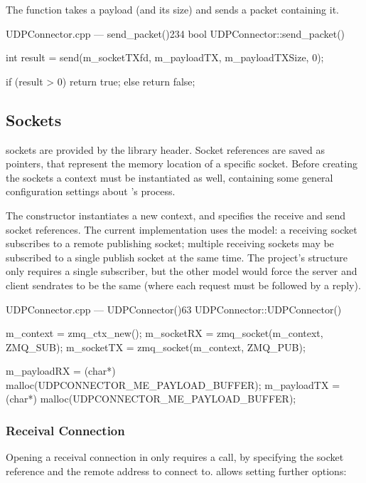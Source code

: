 The  function takes a \gls{payload} (and its size) and sends a \gls{packet} containing it.

\begin{codelist}{UDPConnector.cpp --- send\_packet()}{234}
bool UDPConnector::send_packet() {
	int result = send(m_socketTXfd, m_payloadTX, m_payloadTXSize, 0);

	if (result > 0)
		return true;
	else
		return false;
}
\end{codelist}

\subsection{ Sockets}

 sockets are provided by the  library  header. Socket references are saved as  pointers, that represent the memory location of a specific socket. Before creating the sockets a context must be instantiated as well, containing some general configuration settings about 's process.

The  constructor instantiates a new context, and specifies the receive and send socket references. The current implementation uses the  model: a receiving socket subscribes to a remote publishing socket; multiple receiving sockets may be subscribed to a single publish socket at the same time. The project's structure only requires a single subscriber, but the other  model would force the server and client sendrates to be the same (where each request must be followed by a reply).

\begin{codelist}{UDPConnector.cpp --- UDPConnector()}{63}
UDPConnector::UDPConnector() {
	m_context  = zmq_ctx_new();
	m_socketRX = zmq_socket(m_context, ZMQ_SUB);
	m_socketTX = zmq_socket(m_context, ZMQ_PUB);

	m_payloadRX = (char*) malloc(UDPCONNECTOR_ME_PAYLOAD_BUFFER);
	m_payloadTX = (char*) malloc(UDPCONNECTOR_ME_PAYLOAD_BUFFER);
}
\end{codelist}

\subsubsection{Receival Connection}

Opening a receival connection in  only requires a  call, by specifying the socket reference and the remote address to connect to.  allows setting further options:

